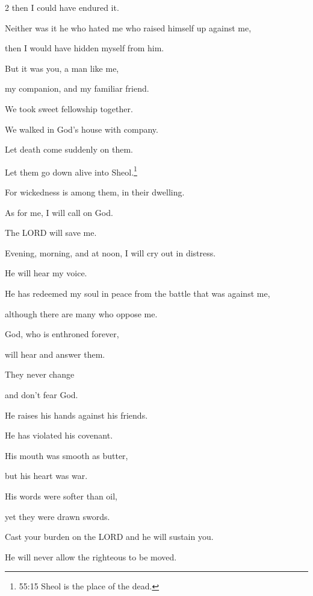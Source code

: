 \begin{multicols}{2}
	then I could have endured it.
	
	Neither was it he who hated me who raised himself up against me,
	
	then I would have hidden myself from him.
	
	
	\myverse{}But it was you, a man like me,
	
	my companion, and my familiar friend.
	
	
	\myverse{}We took sweet fellowship together.
	
	We walked in God’s house with company.
	
	
	\myverse{}Let death come suddenly on them.
	
	Let them go down alive into Sheol.\footnote{55:15 Sheol is the place of the dead.
	}
	
	For wickedness is among them, in their dwelling.
	
	
	\myverse{}As for me, I will call on God.
	
	The LORD will save me.
	
	
	\myverse{}Evening, morning, and at noon, I will cry out in distress.
	
	He will hear my voice.
	
	
	\myverse{}He has redeemed my soul in peace from the battle that was against
	me,
	
	although there are many who oppose me.
	
	
	\myverse{}God, who is enthroned forever,
	
	will hear and answer them.
	
	\vspace{\baselineskip}	
	
	They never change
	
	and don’t fear God.
	
	
	\myverse{}He raises his hands against his friends.
	
	He has violated his covenant.
	
	
	\myverse{}His mouth was smooth as butter,
	
	but his heart was war.
	
	His words were softer than oil,
	
	yet they were drawn swords.
	
	\vspace{\baselineskip}
	
	\myverse{}Cast your burden on the LORD and he will sustain you.
	
	He will never allow the righteous to be moved.
	

\end{multicols}
